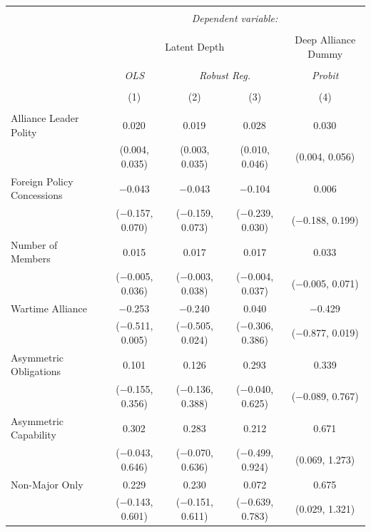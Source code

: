 \documentclass[12pt]{article}
\begin{document}
\begin{table}[!htbp] 
\centering 
\begin{adjustbox}{width= .95\textwidth, center}
\begin{tabular}{@{\extracolsep{5pt}}lcccc} 
\\[-1.8ex]\hline 
\hline \\[-1.8ex] 
 & \multicolumn{4}{c}{\textit{Dependent variable:}} \\ 
\cline{2-5} 
\\[-1.8ex] & \multicolumn{3}{c}{Latent Depth} & Deep Alliance Dummy \\ 
\\[-1.8ex] & \textit{OLS} & \multicolumn{2}{c}{\textit{Robust Reg.}} & \textit{Probit} \\ 
\\[-1.8ex] & (1) & (2) & (3) & (4)\\ 
\hline \\[-1.8ex] 
 Alliance Leader Polity & 0.020$^{}$ & 0.019$^{}$ & 0.028$^{}$ & 0.030$^{}$ \\ 
  & (0.004, 0.035) & (0.003, 0.035) & (0.010, 0.046) & (0.004, 0.056) \\ 
  Foreign Policy Concessions & $-$0.043 & $-$0.043 & $-$0.104 & 0.006 \\ 
  & ($-$0.157, 0.070) & ($-$0.159, 0.073) & ($-$0.239, 0.030) & ($-$0.188, 0.199) \\ 
  Number of Members & 0.015 & 0.017 & 0.017 & 0.033$^{}$ \\ 
  & ($-$0.005, 0.036) & ($-$0.003, 0.038) & ($-$0.004, 0.037) & ($-$0.005, 0.071) \\ 
  Wartime Alliance & $-$0.253$^{}$ & $-$0.240$^{}$ & 0.040 & $-$0.429$^{}$ \\ 
  & ($-$0.511, 0.005) & ($-$0.505, 0.024) & ($-$0.306, 0.386) & ($-$0.877, 0.019) \\ 
  Asymmetric Obligations & 0.101 & 0.126 & 0.293$^{}$ & 0.339 \\ 
  & ($-$0.155, 0.356) & ($-$0.136, 0.388) & ($-$0.040, 0.625) & ($-$0.089, 0.767) \\ 
  Asymmetric Capability & 0.302$^{}$ & 0.283 & 0.212 & 0.671$^{}$ \\ 
  & ($-$0.043, 0.646) & ($-$0.070, 0.636) & ($-$0.499, 0.924) & (0.069, 1.273) \\ 
  Non-Major Only & 0.229 & 0.230 & 0.072 & 0.675$^{}$ \\ 
  & ($-$0.143, 0.601) & ($-$0.151, 0.611) & ($-$0.639, 0.783) & (0.029, 1.321) \\ 

\end{tabular}
\end{adjustbox}
\end{table}
\end{document}
